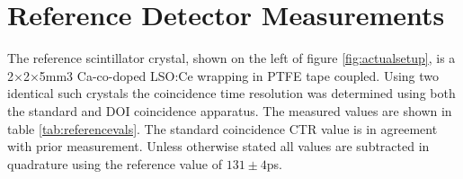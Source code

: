 \section{Reference Detector Measurements}
The reference scintillator crystal, shown on the left of figure \ref{fig:actualsetup}, is a 2×2×5mm3 Ca-co-doped LSO:Ce wrapping in PTFE tape coupled. Using two identical such crystals the coincidence time resolution was determined using both the standard and DOI coincidence apparatus. The measured values are shown in table \ref{tab:referencevals}. The standard coincidence CTR value is in agreement with prior measurement\cite{arron_Meyer_Pauwels_Lecoq_2012}. Unless otherwise stated all values are subtracted in quadrature using the reference value of $131\pm4$ps.